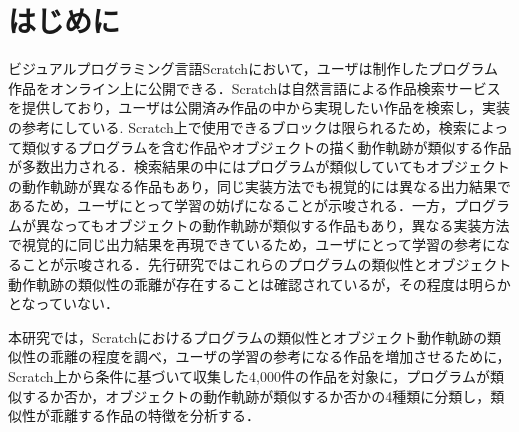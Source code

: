 \documentclass[T,J]{fose} %
\begin{document}
\maketitle \thispagestyle {empty}
\vspace{-5pt}
\section{はじめに}

ビジュアルプログラミング言語Scratchにおいて，ユーザは制作したプログラム作品をオンライン上に公開できる．Scratchは自然言語による作品検索サービスを提供しており，ユーザは公開済み作品の中から実現したい作品を検索し，実装の参考にしている\cite{Resnick_2009}.
Scratch上で使用できるブロックは限られるため，検索によって類似するプログラムを含む作品やオブジェクトの描く動作軌跡が類似する作品が多数出力される．検索結果の中にはプログラムが類似していてもオブジェクトの動作軌跡が異なる作品もあり，同じ実装方法でも視覚的には異なる出力結果であるため，ユーザにとって学習の妨げになることが示唆される．一方，プログラムが異なってもオブジェクトの動作軌跡が類似する作品もあり，異なる実装方法で視覚的に同じ出力結果を再現できているため，ユーザにとって学習の参考になることが示唆される．先行研究\cite{Fukuchi2021}\cite{Mikura2022}ではこれらのプログラムの類似性とオブジェクト動作軌跡の類似性の乖離が存在することは確認されているが，その程度は明らかとなっていない．

本研究では，Scratchにおけるプログラムの類似性とオブジェクト動作軌跡の類似性の乖離の程度を調べ，ユーザの学習の参考になる作品を増加させるために，Scratch上から条件に基づいて収集した4,000件の作品を対象に，プログラムが類似するか否か，オブジェクトの動作軌跡が類似するか否かの4種類に分類し，類似性が乖離する作品の特徴を分析する．

\vspace{-5pt}
\end{document}
